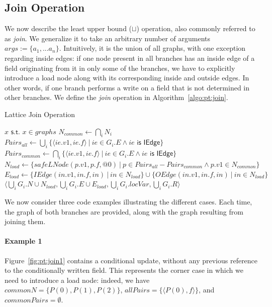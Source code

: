 \subsection{Join Operation}
We now describe the least upper bound ($\sqcup$) operation, also commonly
referred to as \emph{join}. We generalize it to take an arbitrary number of
arguments $args := \{ a_1, ... a_n \}$. Intuitively, it is the union of all
graphs, with one exception regarding inside edges: if one node present in all
branches has an inside edge of a field originating from it in only some of the
branches, we have to explicitly introduce a load node along with its
corresponding inside and outside edges. In other words, if one branch performs
a write on a field that is not determined in other branches. We define the
\emph{join} operation in Algorithm~\ref{algo:pt:join}.
\begin{algorithm}
\caption{Lattice Join Operation}\label{algo:pt:join}
\begin{algorithmic}[1]
        \State \Return $x \textsf{ s.t. } x \in graphs$
    \Else
        \State $N_{common} \gets \bigcap_i N_i$
        \State $Pairs_{all} \gets  \bigcup_i \{ \langle ie.v1, ie.f \rangle ~|~ ie \in G_i.E \land ie \textsf { is IEdge}\}$
        \State $Pairs_{common} \gets  \bigcap_i \{ \langle ie.v1, ie.f \rangle ~|~ ie \in G_i.E \land ie \textsf { is IEdge}\}$
        \State $N_{load} \gets \{ safeLNode(p.v1, p.f, @0) ~|~ p \in Pairs_{all} - Pairs_{common} \land p.v1 \in N_{common} \}$
        \State $E_{load} \gets \{ IEdge(in.v1, in.f, in) ~|~ in \in N_{load} \} \cup \{ OEdge(in.v1, in.f, in) ~|~ in \in N_{load} \}$
        \State \Return $\langle \bigcup_i G_i.N \cup N_{load}, \bigcup_i G_i.E \cup E_{load}, \bigcup_i G_i.locVar , \bigcup_i G_i.R \rangle$
    \EndIf
\EndFunction
\end{algorithmic}
\end{algorithm}

We now consider three code examples illustrating the different cases. Each time,
the graph of both branches are provided, along with the graph resulting
from joining them.

\paragraph{Example 1}
Figure~\ref{fig:pt:join1} contains a conditional update, without any previous
reference to the conditionally written field. This represents the corner case
in which we need to introduce a load node: indeed, we have $commonN = \{P(0),
P(1), P(2)\}$, $allPairs = \{ \langle P(0), f \rangle \}$, and $commonPairs =
\emptyset$.


